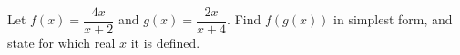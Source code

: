 Let $f(x)=\dfrac{4x}{x+2}$ and $g(x)=\dfrac{2x}{x+4}$. Find $f(g(x))$ in simplest form, and state for which real $x$ it is defined.

